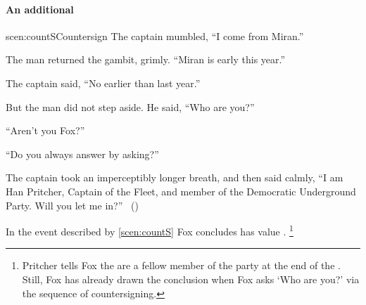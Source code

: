 \paragraph*{An additional }


\begin{note}
  \begin{rscenario}{scen:countS}{Countersign}%
    \indent The captain mumbled, ``I come from Miran.''

    The man returned the gambit, grimly.
    ``Miran is early this year.''

    The captain said, ``No earlier than last year.''

    But the man did not step aside.
    He said, ``Who are you?''

    ``Aren't you Fox?''

    ``Do you always answer by asking?''

    The captain took an imperceptibly longer breath, and then said calmly,
    ``I am Han Pritcher, Captain of the Fleet, and member of the Democratic Underground Party.
    Will you let me in?''%
    \mbox{ }\hfill\mbox{(\cite[70]{Asimov:1945aa})}%
    \newline
  \end{rscenario}

  \noindent%
  In the event described by \autoref{scen:countS} Fox concludes  has value .%
  \footnote{
    Pritcher tells Fox the are a fellow member of the party at the end of the \scen{}.
    Still, Fox has already drawn the conclusion when Fox asks `Who are you?' via the sequence of countersigning.
  }


\end{note}
